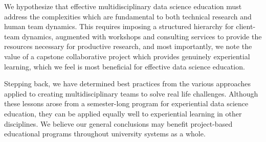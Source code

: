 \documentclass[12pt]{article}
\begin{document}
We hypothesize that effective multidisciplinary data science education must address the complexities which are fundamental to both technical research and human team dynamics. This requires imposing a structured hierarchy for client-team dynamics, augmented with workshops and consulting services to provide the resources necessary for productive research, and most importantly, we note the value of a capstone collaborative project which provides genuinely experiential learning, which we feel is most beneficial for effective data science education.

Stepping back, we have determined best practices from the various approaches applied to creating multidisciplinary teams to solve real life challenges.  Although these lessons arose from a semester-long program for experiential data science education, they can be applied equally well to experiential learning in other disciplines.  We believe our general conclusions may benefit project-based educational programs throughout university systems as a whole.




\newpage

%
%

\newpage
\printbibliography
\end{document}
